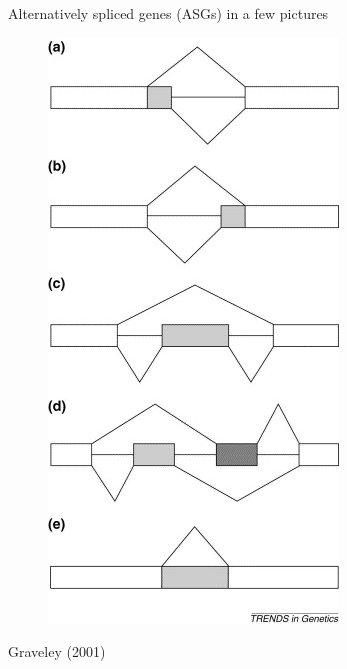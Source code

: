 \documentclass[ignorenonframetext,aspectratio=169,]{beamer}
\begin{document}
\begin{frame}{%
\protect\hypertarget{alternatively-spliced-genes-asgs-in-a-few-pictures}{%
Alternatively spliced genes (ASGs) in a few pictures}}

\begin{figure}[htb]
   \centering
 \includegraphics[keepaspectratio,width=\textwidth,height=0.75\textheight]{../n1pas/figures/splice_figure.jpg}
    \end{figure}

Graveley (2001)

\end{frame}
\end{document}

